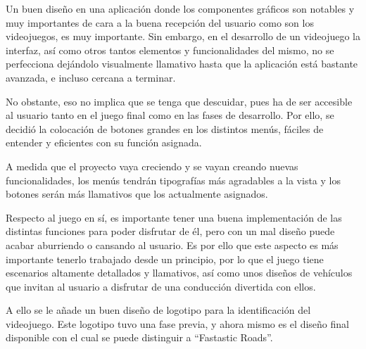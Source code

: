 Un buen diseño en una aplicación donde los componentes gráficos son notables y muy importantes de cara a la buena recepción del usuario como son los videojuegos, es muy importante. Sin embargo, en el desarrollo de un videojuego la interfaz, así como otros tantos elementos y funcionalidades del mismo, no se perfecciona dejándolo visualmente llamativo hasta que la aplicación está bastante avanzada, e incluso cercana a terminar.

No obstante, eso no implica que se tenga que descuidar, pues ha de ser accesible al usuario tanto en el juego final como en las fases de desarrollo. Por ello, se decidió la colocación de botones grandes en los distintos menús, fáciles de entender y eficientes con su función asignada.


A medida que el proyecto vaya creciendo y se vayan creando nuevas funcionalidades, los menús tendrán tipografías más agradables a la vista y los botones serán más llamativos que los actualmente asignados.

Respecto al juego en sí, es importante tener una buena implementación de las distintas funciones para poder disfrutar de él, pero con un mal diseño puede acabar aburriendo o cansando al usuario. Es por ello que este aspecto es más importante tenerlo trabajado desde un principio, por lo que el juego tiene escenarios altamente detallados y llamativos, así como unos diseños de vehículos que invitan al usuario a disfrutar de una conducción divertida con ellos.


A ello se le añade un buen diseño de logotipo para la identificación del videojuego. Este logotipo tuvo una fase previa, y ahora mismo es el diseño final disponible con el cual se puede distinguir a ``Fastastic Roads''.

